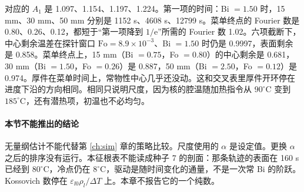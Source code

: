 对应的 \(A_1\) 是 1.097、1.154、1.197、1.224。第一项的时间：Bi \(=1.50\) 时，15 mm、30 mm、50 mm 分别是 1152 s、4608 s、12799 s。菜单终点的 Fourier 数是 0.80、0.26、0.12，都短于“第一项降到 \(1/\mathrm{e}\)”所需的 Fourier 数 1.02。六项截断下，中心剩余温差在探针窗口 \(\mathrm{Fo}=8.9\times 10^{-3}\)、Bi \(=1.50\) 时仍是 0.9997，表面剩余是 0.858。菜单终点上，15 mm（Bi \(=0.75\)，Fo \(=0.80\)）的中心剩余是 0.681，30 mm（Bi \(=1.50\)，Fo \(=0.26\)）是 0.887，50 mm（Bi \(=2.50\)，Fo \(=0.12\)）是 0.974。厚件在菜单时间上，常物性中心几乎还没动。这和交叉表里厚件开环停在进度下沿的方向相同。相同只说明尺度，因为核的腔温随加热指令从 \(90^\circ\mathrm{C}\) 变到 \(185^\circ\mathrm{C}\)，还有潜热项，初温也不必均匀。

\paragraph{本节不能推出的结论}
无量纲估计不能代替第 \ref{ch:sim} 章的策略比较。尺度使用的 \(\alpha\) 是设定值。更换 \(\alpha\) 之后的排序没有运行。本征根表不能读成种子 7 的剖面：那条轨迹的表面在 160 s 已经到 \(80^\circ\mathrm{C}\)，冷点仍在 \(8^\circ\mathrm{C}\)，驱动是随时间变化的通量，不是一次常 Bi 的阶跃。Kossovich 数停在 \(\varepsilon_{l0}\rho_l/\Delta T\) 上。本章不报告它的一个纯数。
